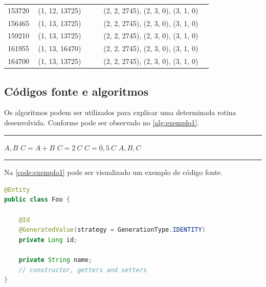\begin{longtable}{@{}p{0.14\linewidth}p{0.30\linewidth}p{0.50\linewidth}@{}}
153720 & (1, 12, 13725) & (2, 2, 2745), (2, 3, 0), (3, 1, 0)                  \\
156465 & (1, 13, 13725) & (2, 2, 2745), (2, 3, 0), (3, 1, 0)                  \\
159210 & (1, 13, 13725) & (2, 2, 2745), (2, 3, 0), (3, 1, 0)                  \\
161955 & (1, 13, 16470) & (2, 2, 2745), (2, 3, 0), (3, 1, 0)                  \\
164700 & (1, 13, 13725) & (2, 2, 2745), (2, 3, 0), (3, 1, 0)                  \\
\end{longtable}


\subsection{Códigos fonte e algoritmos}\label{subsec:algoritimos}

Os algoritmos podem ser utilizados para explicar uma determinada rotina desenvolvida. Conforme pode ser observado no \autoref{alg:exemplo1}.

\begin{algorithm}[htb]%
\caption{Algoritmo de exemplo}%
\label{alg:exemplo1}%
\hrule
\begin{algorithmic}[1]%
\ENSURE $A, B$
\STATE $C = A + B$
\STATE $C = 2 \ C$
\ELSE
\STATE $C = 0,5 \ C$
\ENDIF
\PRINT $A, B, C$
\end{algorithmic}
\hrule
\fonte{}%
\end{algorithm}

\lipsum[1]

\lipsum[1]

Na \autoref{code:exemplo1} pode ser visualizado um exemplo de código fonte.

\begin{sourcecode}[htb]
\caption{\label{code:exemplo1}Exemplo de código}
\begin{lstlisting}[frame=single, language=Java]
@Entity
public class Foo {
 
    @Id
    @GeneratedValue(strategy = GenerationType.IDENTITY)
    private Long id;
 
    private String name;
    // constructor, getters and setters
}
\end{lstlisting}
\fonte{}
\end{sourcecode}

